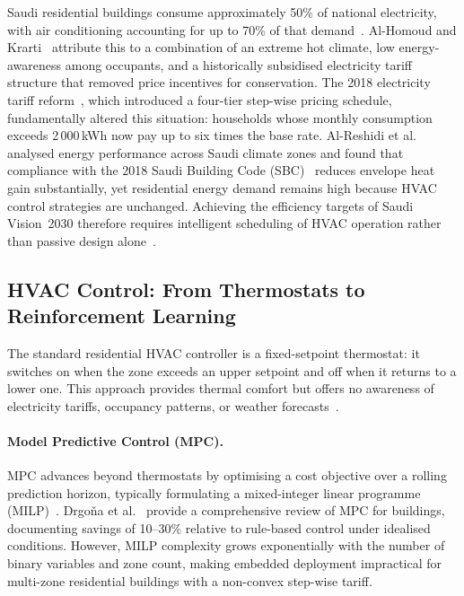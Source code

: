 \documentclass[12pt,a4paper]{article}
\let\oldsubsection\subsection
\renewcommand{\subsection}[1]{\FloatBarrier\oldsubsection{#1}}
\begin{document}
Saudi residential buildings consume approximately 50\% of national
electricity, with air conditioning accounting for up to 70\% of that
demand~\cite{AlHomoud2021,Krarti2020}.
Al-Homoud and Krarti~\cite{AlHomoud2021} attribute this to a combination of an extreme
hot climate, low energy-awareness among occupants, and a historically
subsidised electricity tariff structure that removed price incentives
for conservation.
The 2018 electricity tariff reform~\cite{Nahiduzzaman2023}, which introduced
a four-tier step-wise pricing schedule, fundamentally altered this situation:
households whose monthly consumption exceeds 2\,000\,kWh now pay up to
six times the base rate.
Al-Reshidi et al.~\cite{AlReshidi2024} analysed energy performance across
Saudi climate zones and found that compliance with the 2018 Saudi Building
Code (SBC)~\cite{Alayed2021} reduces envelope heat gain substantially,
yet residential energy demand remains high because HVAC control strategies
are unchanged.
Achieving the efficiency targets of Saudi Vision~2030 therefore requires
intelligent scheduling of HVAC operation rather than passive design alone~\cite{Belaid2025}.

\subsection{HVAC Control: From Thermostats to Reinforcement Learning}

The standard residential HVAC controller is a fixed-setpoint
thermostat: it switches on when the zone exceeds an upper setpoint and off
when it returns to a lower one.
This approach provides thermal comfort but offers no awareness of electricity
tariffs, occupancy patterns, or weather forecasts~\cite{Alotaibi2024}.

\paragraph{Model Predictive Control (MPC).}
MPC advances beyond thermostats by optimising a cost objective over a
rolling prediction horizon, typically formulating a mixed-integer linear
programme (MILP)~\cite{Risbeck2017}.
Drgoňa et al.~\cite{Drgona2020} provide a comprehensive review of
MPC for buildings, documenting savings of 10--30\% relative to
rule-based control under idealised conditions.
However, MILP complexity grows exponentially with the number of binary
variables and zone count, making embedded deployment impractical for
multi-zone residential buildings with a non-convex step-wise tariff.
\end{document}
